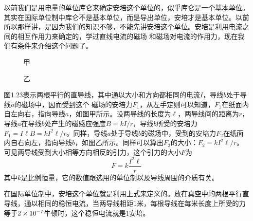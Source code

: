 以前我们是用电量的单位库仑来确定安培这个单位的，似乎库仑是一个基本单位。其实在国际单位制中库仑不是基本单位，而是导出单位，安培才是基本单位。以前所以那样讲，是因为我们的知识不够，不能先讲安培这个单位。安培是利用电流之间的相互作用力来确定的，学过直线电流的磁场
和磁场对电流的作用力，现在我们有条件来介绍这个问题了。
\begin{figure}[htp]
\centering
\begin{minipage}[t]{0.48\textwidth}
\centering
{}
\caption*{甲}
\end{minipage}
\begin{minipage}[t]{0.48\textwidth}
\centering
{}
\caption*{乙}
\end{minipage}
\caption{}
\end{figure}

图1.23表示两根平行的直导线，其中通以大小和方向都相同的电流$I$，导线$b$处于导线$a$的磁场中，因而受到这个
磁场的安培力$F_1$，从左手定则可以知道，$F_1$在纸面内自左向右，指向导线$a$，如图甲所示。设两导线的长度为$\ell$，两导线间的距离为$r$，导线$a$在导线$b$处产生的磁感应强度$B=kI/r$，导线$b$所受的安培力$F_1=I\ell B=kI^2\ell/r$。同样，导线$a$处于导线$b$的磁场中，受到的安培力$F_2$在纸面内自右向左，指向导线$b$，如图乙所示。同样可以算出$F_2$的大小：$F_2=kI^2\ell/r$。可见两导线受到大小相等方向相反的引力，这个引力的大小$F$为
\[F=k\frac{I^2\ell}{r}\]
其中$k$是比例恒量，它的数值跟选用的单位制以及导线周围的介质有关。

在国际单位制中，安培这个单位就是利用上式来定义的。放在真空中的两根平行直导线，通以相同的稳恒电流，当两导线相距1米，每根导线在每米长度上所受的力等于$2\times10^{-7}$牛顿时，这个稳恒电流就是1安培。

